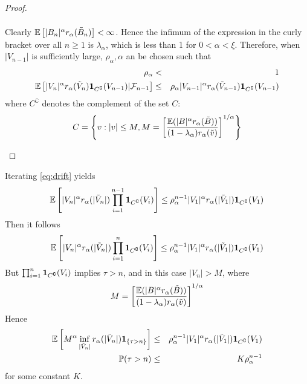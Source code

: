 \documentclass{article}
\begin{document}
\begin{proof}
\begin{enumerate}[(i)]
\begin{eqnarray*}
    \end{eqnarray*}
    Clearly $\mathbb{E}\left[|B_n|^\alpha r_{\alpha}(\tilde B_n)\right] <
    \infty$. Hence the infimum of the expression in the curly bracket
    over all $n \geq 1$ is $\lambda_{\alpha}$, which is less than 1 for $0 < \alpha < \xi$.    
    Therefore, when $|V_{n-1}|$ is sufficiently large, $\rho_\alpha, \alpha$ an be
    chosen such that
    \begin{eqnarray*}
      \rho_\alpha &<& 1 \\
      \mathbb{E} \left[ |V_n|^\alpha r_{\alpha}(\tilde V_n)  \mathbf{1}_{C^\complement}(V_{n-1})
        | \mathcal F_{n-1} \right] &\leq&
      \rho_\alpha |V_{n-1}|^\alpha r_{\alpha}(\tilde V_{n-1}) \mathbf{1}_{C^\complement}(V_{n-1})
    \end{eqnarray*}
    where $C^\complement$ denotes the complement of the set $C$:
    \[
    C = \left\{
      v: |v| \leq M, M = \left[
        \mathbb{E} (|B|^\alpha r_\alpha(\tilde B)) 
        \over
        (1 - \lambda_\alpha) r_\alpha(\tilde v)
      \right]^{1/\alpha}
    \right\}
    \]
  \end{enumerate}    
\end{proof}
  Iterating \eqref{eq:drift} yields
  \[
  \mathbb{E} \left[
         |V_n|^\alpha r_{\alpha}(|\tilde V_n|) \prod_{i=1}^{n-1}\mathbf{1}_{C^\complement}(V_i)\right]
      \leq \rho_\alpha^{n-1} |V_1|^\alpha r_{\alpha}(|\tilde V_1|) \mathbf{1}_{C^\complement}(V_1)
  \]
  Then it follows
  \[
  \mathbb{E} \left[
         |V_n|^\alpha r_{\alpha}(|\tilde V_n|) \prod_{i=1}^{n}\mathbf{1}_{C^\complement}(V_i)\right]
      \leq \rho_\alpha^{n-1} |V_1|^\alpha r_{\alpha}(|\tilde V_1|) \mathbf{1}_{C^\complement}(V_1)
  \]
  But $\prod_{i=1}^{n}\mathbf{1}_{C^\complement}(V_i)$ implies $\tau > n$, and in this
  case $|V_n| > M$, where
  \[
  M = \left[
        \mathbb{E} (|B|^\alpha r_\alpha(\tilde B)) 
        \over
        (1 - \lambda_\alpha) r_\alpha(\tilde v)
      \right]^{1/\alpha}
  \]
  Hence
  \begin{eqnarray}
    \mathbb{E} \left[
      M^\alpha \inf_{|\tilde V_n|} r_{\alpha}(|\tilde V_n|) \mathbf{1}_{\{\tau > n\}}\right]
    &\leq& \rho_\alpha^{n-1} |V_1|^\alpha r_{\alpha}(|\tilde V_1|) \mathbf{1}_{C^\complement}(V_1) \nonumber \\
    \mathbb{P}(\tau > n) &\leq& K \rho_\alpha^{n-1} \label{eq:ret_time}
  \end{eqnarray}
  for some constant $K$.
  
\end{document}
